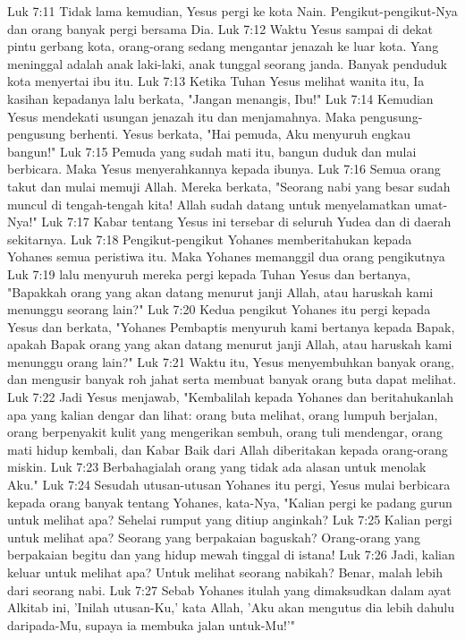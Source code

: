Luk 7:11  Tidak lama kemudian, Yesus pergi ke kota Nain. Pengikut-pengikut-Nya dan orang banyak pergi bersama Dia.
Luk 7:12  Waktu Yesus sampai di dekat pintu gerbang kota, orang-orang sedang mengantar jenazah ke luar kota. Yang meninggal adalah anak laki-laki, anak tunggal seorang janda. Banyak penduduk kota menyertai ibu itu.
Luk 7:13  Ketika Tuhan Yesus melihat wanita itu, Ia kasihan kepadanya lalu berkata, "Jangan menangis, Ibu!"
Luk 7:14  Kemudian Yesus mendekati usungan jenazah itu dan menjamahnya. Maka pengusung-pengusung berhenti. Yesus berkata, "Hai pemuda, Aku menyuruh engkau bangun!"
Luk 7:15  Pemuda yang sudah mati itu, bangun duduk dan mulai berbicara. Maka Yesus menyerahkannya kepada ibunya.
Luk 7:16  Semua orang takut dan mulai memuji Allah. Mereka berkata, "Seorang nabi yang besar sudah muncul di tengah-tengah kita! Allah sudah datang untuk menyelamatkan umat-Nya!"
Luk 7:17  Kabar tentang Yesus ini tersebar di seluruh Yudea dan di daerah sekitarnya.
Luk 7:18  Pengikut-pengikut Yohanes memberitahukan kepada Yohanes semua peristiwa itu. Maka Yohanes memanggil dua orang pengikutnya
Luk 7:19  lalu menyuruh mereka pergi kepada Tuhan Yesus dan bertanya, "Bapakkah orang yang akan datang menurut janji Allah, atau haruskah kami menunggu seorang lain?"
Luk 7:20  Kedua pengikut Yohanes itu pergi kepada Yesus dan berkata, "Yohanes Pembaptis menyuruh kami bertanya kepada Bapak, apakah Bapak orang yang akan datang menurut janji Allah, atau haruskah kami menunggu orang lain?"
Luk 7:21  Waktu itu, Yesus menyembuhkan banyak orang, dan mengusir banyak roh jahat serta membuat banyak orang buta dapat melihat.
Luk 7:22  Jadi Yesus menjawab, "Kembalilah kepada Yohanes dan beritahukanlah apa yang kalian dengar dan lihat: orang buta melihat, orang lumpuh berjalan, orang berpenyakit kulit yang mengerikan sembuh, orang tuli mendengar, orang mati hidup kembali, dan Kabar Baik dari Allah diberitakan kepada orang-orang miskin.
Luk 7:23  Berbahagialah orang yang tidak ada alasan untuk menolak Aku."
Luk 7:24  Sesudah utusan-utusan Yohanes itu pergi, Yesus mulai berbicara kepada orang banyak tentang Yohanes, kata-Nya, "Kalian pergi ke padang gurun untuk melihat apa? Sehelai rumput yang ditiup anginkah?
Luk 7:25  Kalian pergi untuk melihat apa? Seorang yang berpakaian baguskah? Orang-orang yang berpakaian begitu dan yang hidup mewah tinggal di istana!
Luk 7:26  Jadi, kalian keluar untuk melihat apa? Untuk melihat seorang nabikah? Benar, malah lebih dari seorang nabi.
Luk 7:27  Sebab Yohanes itulah yang dimaksudkan dalam ayat Alkitab ini, 'Inilah utusan-Ku,' kata Allah, 'Aku akan mengutus dia lebih dahulu daripada-Mu, supaya ia membuka jalan untuk-Mu!'"
